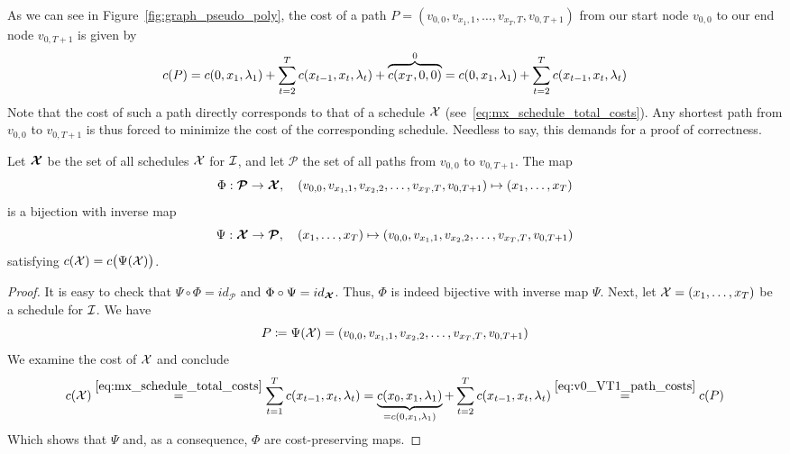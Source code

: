 As we can see in Figure~\ref{fig:graph_pseudo_poly}, the cost of a path $P=(v_{0,0},v_{x_1,1},\ldots,v_{x_T,T},v_{0,T+1})$ from our start node $v_{0,0}$ to our end node $v_{0,T+1}$ is given by 
\begin{equation}
	c(P)=c(0,x_1,\lambda_1)+\sum\limits_{t=2}^{T}c(x_{t-1},x_{t},\lambda_{t})+\overbrace{c(x_T,0,0)}^{0}=c(0,x_1,\lambda_1)+\sum\limits_{t=2}^{T}c(x_{t-1},x_{t},\lambda_{t})\label{eq:v0_VT1_path_costs}
\end{equation}
Note that the cost of such a path directly corresponds to that of a schedule $\mathcal{X}$ (see~\eqref{eq:mx_schedule_total_costs}).
Any shortest path from $v_{0,0}$ to $v_{0,T+1}$ is thus forced to minimize the cost of the corresponding schedule. Needless to say, this demands for a proof of correctness.
\begin{lem}\label{lem:sched_path_pseudo_poly}
Let $\bm{\mathcal{X}}$ be the set of all schedules $\mathcal{X}$ for $\mathcal{I}$, and let $\bm{\mathcal{P}}$ the set of all paths from $v_{0,0}$ to $v_{0,T+1}$. The map
\begin{equation*}
	\Phi:\bm{\mathcal{P}}\rightarrow\bm{\mathcal{X}},\quad (v_{0,0},v_{x_1,1},v_{x_2,2},\ldots,v_{x_T,T},v_{0,T+1})\mapsto (x_1,\ldots,x_T)
\end{equation*}
is a bijection with inverse map
\begin{equation*}
	\Psi:\bm{\mathcal{X}}\rightarrow\bm{\mathcal{P}},\quad(x_1,\ldots,x_T)\mapsto (v_{0,0},v_{x_1,1},v_{x_2,2},\ldots,v_{x_T,T},v_{0,T+1})
\end{equation*}
satisfying $c(\mathcal{X})=c\bigl(\Psi(\mathcal{X})\bigr)$.
\end{lem}
\begin{proof}
It is easy to check that $\Psi\circ\Phi=id_{\bm{\mathcal{P}}}$ and $\Phi\circ\Psi=id_{\bm{\mathcal{X}}}$. Thus, $\Phi$ is indeed bijective with inverse map $\Psi$. Next, let $\mathcal{X}=(x_1,\ldots,x_T)$ be a schedule for $\mathcal{I}$. We have
\begin{equation*}
	P\coloneqq\Psi(\mathcal{X})=(v_{0,0},v_{x_1,1},v_{x_2,2},\ldots,v_{x_T,T},v_{0,T+1})
\end{equation*}
We examine the cost of $\mathcal{X}$ and conclude
\begin{equation*}
c(\mathcal{X})\stackrel{\eqref{eq:mx_schedule_total_costs}}{=}\sum\limits_{t=1}^{T}c(x_{t-1},x_{t},\lambda_t)=\underbrace{c(x_0,x_1,\lambda_1)}_{=c(0,x_1,\lambda_1)}+\sum\limits_{t=2}^{T}c(x_{t-1},x_{t},\lambda_t)\stackrel{\eqref{eq:v0_VT1_path_costs}}{=}c(P)
\end{equation*}
Which shows that $\Psi$ and, as a consequence, $\Phi$ are cost-preserving maps.
\end{proof}
